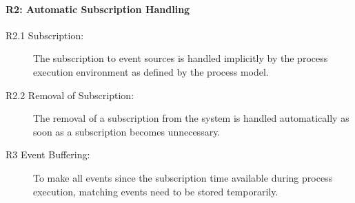 
\paragraph{R2: Automatic Subscription Handling}

\begin{description}
	\item[R2.1 Subscription:] 
	The subscription to event sources is handled implicitly by the process execution environment as defined by the process model.
	\item[R2.2 Removal of Subscription:] 
	The removal of a subscription from the system is handled automatically as soon as a subscription becomes unnecessary.
\end{description}


\begin{description}
	\item[R3 Event Buffering:]
	To make all events since the subscription time available during process execution, matching events need to be stored temporarily.
\end{description}

